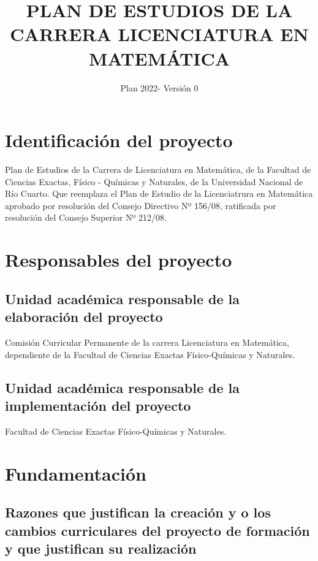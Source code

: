 \documentclass[a4paper, 12pt]{article}
\begin{document}
\title{PLAN DE ESTUDIOS DE LA CARRERA LICENCIATURA EN MATEMÁTICA}
\author{Plan 2022- Versión 0}
\date{}
 \maketitle

 \newpage



\tableofcontents

\newpage


\section{Identificación del proyecto}  

Plan de Estudios de la 
Carrera de Licenciatura en Matemática, de la Facultad de Ciencias Exactas, 
Físico - Químicas y Naturales, de la Universidad Nacional de Río Cuarto. Que reemplaza el Plan de Estudio de la Licenciatrura en Matemática aprobado por resolución del Consejo Directivo Nº 156/08, 
ratificada por resolución del Consejo Superior Nº 212/08.


\section{Responsables del proyecto}

\subsection{Unidad académica responsable de la elaboración del proyecto}

Comisión Curricular Permanente de la carrera Licenciatura en Matemática, dependiente de 
la Facultad de Ciencias Exactas Físico-Químicas y Naturales.

\subsection{Unidad académica responsable de la implementación del proyecto}

Facultad de Ciencias Exactas Físico-Químicas y Naturales. 



\section{Fundamentación}

\subsection{Razones que justifican la creación y o los cambios curriculares del proyecto de formación  y que justifican su realización}
\end{document}
